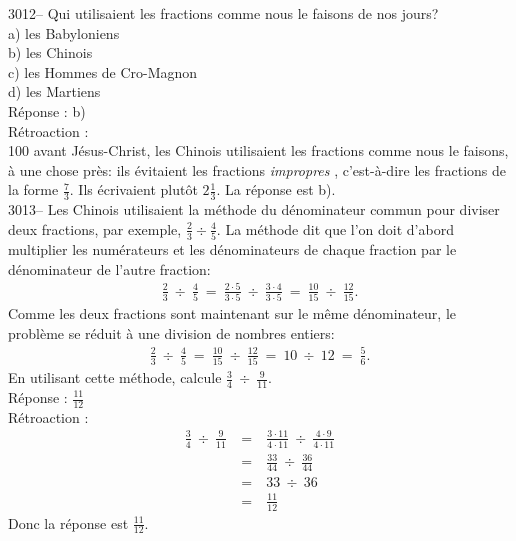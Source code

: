 \documentclass[letterpaper, 12pt]{article}
\begin{document}
3012-- Qui utilisaient les fractions comme nous le faisons de nos jours?\\

a) les Babyloniens\\
b) les Chinois\\
c) les Hommes de Cro-Magnon\\
d) les Martiens\\

R\'eponse : b)\\

R\'etroaction :\\
100 avant J\'esus-Christ, les Chinois utilisaient les fractions comme nous le faisons, \`a une chose pr\`es: ils \'evitaient les fractions \og \emph{impropres} \fg, c'est-\`a-dire les fractions de la forme $\frac{7}{3}$. Ils \'ecrivaient plut\^ot $2 \frac{1}{3}$. La r\'eponse est b).\\



3013-- Les Chinois utilisaient la m\'ethode du d\'enominateur commun pour diviser deux fractions, par exemple, $\frac{2}{3} \div \frac{4}{5}$. La m\'ethode dit que l'on doit d'abord multiplier les num\'erateurs et les d\'enominateurs de chaque fraction par le d\'enominateur de l'autre fraction:\\
\begin{eqnarray*}
\frac{2}{3} \ \div \ \frac{4}{5} \ = \ \frac{2\cdot5}{3\cdot5} \ \div \ \frac{3\cdot4}{3\cdot5} \ = \ \frac{10}{15} \ \div \ \frac{12}{15}.
\end{eqnarray*}
Comme les deux fractions sont maintenant sur le m\^eme d\'enominateur, le probl\`eme se r\'eduit \`a une division de nombres entiers:
\begin{eqnarray*}
\frac{2}{3} \ \div \ \frac{4}{5} \ = \ \frac{10}{15} \ \div \ \frac{12}{15} \ = \ 10 \ \div \ 12 \ = \ \frac{5}{6}.
\end{eqnarray*}
En utilisant cette m\'ethode, calcule $\frac{3}{4} \ \div \ \frac{9}{11}$.\\

R\'eponse : $\frac{11}{12}$\\

R\'etroaction :\\
\begin{eqnarray*}
\frac{3}{4} \ \div \ \frac{9}{11} \ &=& \ \frac{3\cdot11}{4\cdot11} \ \div \ \frac{4\cdot9}{4\cdot11}\\[2mm]
&=& \ \frac{33}{44} \ \div \ \frac{36}{44}\\[2mm]
&=& \ 33 \ \div \ 36\\[2mm]
&=& \ \frac{11}{12}
\end{eqnarray*}
Donc la r\'eponse est $\frac{11}{12}$.\\
\end{document}
